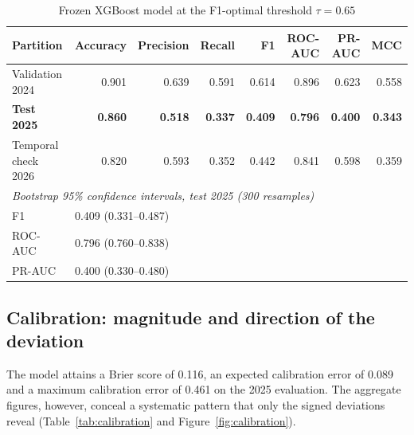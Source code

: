 \documentclass[sn-vancouver,Numbered]{sn-jnl}
\begin{document}
\begin{table}[h]
\caption{Frozen XGBoost model at the F1-optimal threshold $\tau = 0.65$}\label{tab:final}
\begin{tabular}{lrrrrrrr}
\toprule
Partition & Accuracy & Precision & Recall & F1 & ROC-AUC & PR-AUC & MCC \\
\midrule
Validation 2024 & 0.901 & 0.639 & 0.591 & 0.614 & 0.896 & 0.623 & 0.558 \\
\textbf{Test 2025} & \textbf{0.860} & \textbf{0.518} & \textbf{0.337} & \textbf{0.409} & \textbf{0.796} & \textbf{0.400} & \textbf{0.343} \\
Temporal check 2026 & 0.820 & 0.593 & 0.352 & 0.442 & 0.841 & 0.598 & 0.359 \\
\midrule
\multicolumn{8}{l}{\emph{Bootstrap 95\% confidence intervals, test 2025 (300 resamples)}}\\
F1 & \multicolumn{7}{l}{0.409 (0.331--0.487)} \\
ROC-AUC & \multicolumn{7}{l}{0.796 (0.760--0.838)} \\
PR-AUC & \multicolumn{7}{l}{0.400 (0.330--0.480)} \\
\bottomrule
\end{tabular}
\end{table}

\subsection{Calibration: magnitude and direction of the deviation}\label{sec:calibration}

The model attains a Brier score of 0.116, an expected calibration error of 0.089 and a maximum calibration error of 0.461 on the 2025 evaluation. The aggregate figures, however, conceal a systematic pattern that only the signed deviations reveal (Table~\ref{tab:calibration} and Figure~\ref{fig:calibration}).
\end{document}
